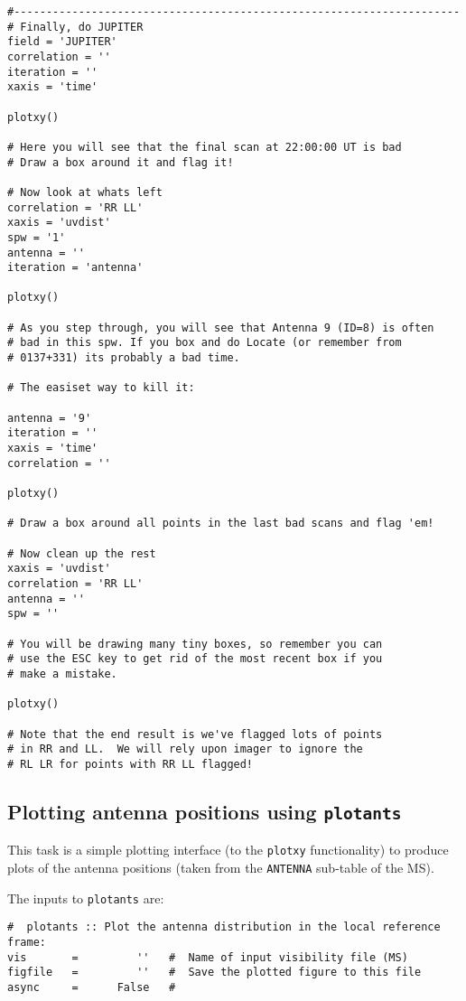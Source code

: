 \begin{verbatim}
#---------------------------------------------------------------------
# Finally, do JUPITER
field = 'JUPITER'
correlation = ''
iteration = ''
xaxis = 'time'

plotxy()

# Here you will see that the final scan at 22:00:00 UT is bad
# Draw a box around it and flag it!

# Now look at whats left
correlation = 'RR LL'
xaxis = 'uvdist'
spw = '1'
antenna = ''
iteration = 'antenna'

plotxy()

# As you step through, you will see that Antenna 9 (ID=8) is often 
# bad in this spw. If you box and do Locate (or remember from
# 0137+331) its probably a bad time.

# The easiset way to kill it:

antenna = '9'
iteration = ''
xaxis = 'time'
correlation = ''

plotxy()

# Draw a box around all points in the last bad scans and flag 'em!

# Now clean up the rest
xaxis = 'uvdist'
correlation = 'RR LL'
antenna = ''
spw = ''

# You will be drawing many tiny boxes, so remember you can
# use the ESC key to get rid of the most recent box if you
# make a mistake.

plotxy()

# Note that the end result is we've flagged lots of points
# in RR and LL.  We will rely upon imager to ignore the
# RL LR for points with RR LL flagged!

\end{verbatim}
\normalsize

\subsection{Plotting antenna positions using {\tt plotants}}
\label{section:edit.plot.plotants}

This task is a simple plotting interface (to the {\tt plotxy}
functionality) to produce plots of the antenna positions (taken from
the {\tt ANTENNA} sub-table of the MS).

The inputs to {\tt plotants} are:
\small
\begin{verbatim}
#  plotants :: Plot the antenna distribution in the local reference frame:
vis       =         ''   #  Name of input visibility file (MS)
figfile   =         ''   #  Save the plotted figure to this file
async     =      False   #  
\end{verbatim}
\normalsize



